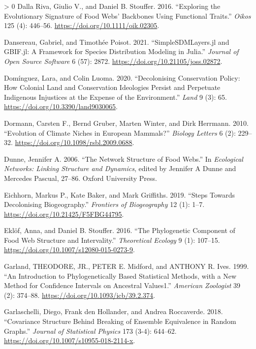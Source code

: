 \documentclass[11pt]{article}
\newlength{\cslhangindent}
\newenvironment{CSLReferences}[3] %
 {%
  \setlength{\parindent}{0pt}
  \ifodd #1 \everypar{\setlength{\hangindent}{\cslhangindent}}\ignorespaces\fi
  \ifnum #2 > 0
  \setlength{\parskip}{#2\baselineskip}
  \fi
 }%
 {}
\begin{document}
\begin{CSLReferences}{1}{0}
\leavevmode\hypertarget{ref-DallaRiva2016ExpEvo}{}%
Dalla Riva, Giulio V., and Daniel B. Stouffer. 2016. {``Exploring the
Evolutionary Signature of Food Webs' Backbones Using Functional
Traits.''} \emph{Oikos} 125 (4): 446--56.
\url{https://doi.org/10.1111/oik.02305}.

\leavevmode\hypertarget{ref-Dansereau2021SimJl}{}%
Dansereau, Gabriel, and Timothée Poisot. 2021. {``SimpleSDMLayers.jl and
GBIF.jl: A Framework for Species Distribution Modeling in Julia.''}
\emph{Journal of Open Source Software} 6 (57): 2872.
\url{https://doi.org/10.21105/joss.02872}.

\leavevmode\hypertarget{ref-Dominguez2020DecCon}{}%
Domínguez, Lara, and Colin Luoma. 2020. {``Decolonising Conservation
Policy: How Colonial Land and Conservation Ideologies Persist and
Perpetuate Indigenous Injustices at the Expense of the Environment.''}
\emph{Land} 9 (3): 65. \url{https://doi.org/10.3390/land9030065}.

\leavevmode\hypertarget{ref-Dormann2010EvoCli}{}%
Dormann, Carsten F., Bernd Gruber, Marten Winter, and Dirk Herrmann.
2010. {``Evolution of Climate Niches in European Mammals?''}
\emph{Biology Letters} 6 (2): 229--32.
\url{https://doi.org/10.1098/rsbl.2009.0688}.

\leavevmode\hypertarget{ref-Dunne2006NetStr}{}%
Dunne, Jennifer A. 2006. {``The Network Structure of Food Webs.''} In
\emph{Ecological Networks: Linking Structure and Dynamics}, edited by
Jennifer A Dunne and Mercedes Pascual, 27--86. Oxford University Press.

\leavevmode\hypertarget{ref-Eichhorn2019SteDec}{}%
Eichhorn, Markus P., Kate Baker, and Mark Griffiths. 2019. {``Steps
Towards Decolonising Biogeography.''} \emph{Frontiers of Biogeography}
12 (1): 1--7. \url{https://doi.org/10.21425/F5FBG44795}.

\leavevmode\hypertarget{ref-Eklof2016PhyCom}{}%
Eklöf, Anna, and Daniel B. Stouffer. 2016. {``The Phylogenetic Component
of Food Web Structure and Intervality.''} \emph{Theoretical Ecology} 9
(1): 107--15. \url{https://doi.org/10.1007/s12080-015-0273-9}.

\leavevmode\hypertarget{ref-Garland1999IntPhy}{}%
Garland, THEODORE, JR., PETER E. Midford, and ANTHONY R. Ives. 1999.
{``An Introduction to Phylogenetically Based Statistical Methods, with a
New Method for Confidence Intervals on Ancestral Values1.''}
\emph{American Zoologist} 39 (2): 374--88.
\url{https://doi.org/10.1093/icb/39.2.374}.

\leavevmode\hypertarget{ref-Garlaschelli2018CovStr}{}%
Garlaschelli, Diego, Frank den Hollander, and Andrea Roccaverde. 2018.
{``Covariance Structure Behind Breaking of Ensemble Equivalence in
Random Graphs.''} \emph{Journal of Statistical Physics} 173 (3-4):
644--62. \url{https://doi.org/10.1007/s10955-018-2114-x}.


\end{CSLReferences}
\end{document}
